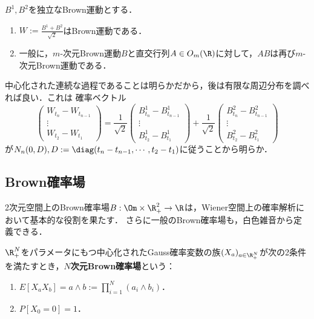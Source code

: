 \documentclass[uplatex,dvipdfmx]{jsreport}
\begin{document}
\begin{proposition}[Brown運動の回転不変性]\label{prop-sum-of-two-independent-Brownian-motion}
    $B^1,B^2$を独立なBrown運動とする．
    \begin{enumerate}
        \item $W:=\frac{B^1+B^2}{\sqrt{2}}$はBrown運動である．
        \item 一般に，$m$-次元Brown運動$B$と直交行列$A\in O_m(\R)$に対して，$AB$は再び$m$-次元Brown運動である．
    \end{enumerate}
\end{proposition}
\begin{Proof}
    中心化された連続な過程であることは明らかだから，後は有限な周辺分布を調べれば良い．これは
    確率ベクトル
    \[\begin{pmatrix}W_{t_n}-W_{t_{n-1}}\\\vdots\\W_{t_2}-W_{t_1}\end{pmatrix}=\frac{1}{\sqrt{2}}\begin{pmatrix}B^1_{t_n}-B^1_{t_{n-1}}\\\vdots\\B^1_{t_2}-B^1_{t_1}\end{pmatrix}+\frac{1}{\sqrt{2}}\begin{pmatrix}B^2_{t_n}-B^2_{t_{n-1}}\\\vdots\\B^2_{t_2}-B^2_{t_1}\end{pmatrix}\]
    が$N_n(0,D),D:=\diag(t_n-t_{n-1},\cdots,t_2-t_1)$に従うことから明らか．
\end{Proof}

\subsection{Brown確率場}

\begin{tcolorbox}[colframe=ForestGreen, colback=ForestGreen!10!white,breakable,colbacktitle=ForestGreen!40!white,coltitle=black,fonttitle=\bfseries\sffamily,
title=]
    2次元空間上のBrown確率場$B:\Om\times\R_+^2\to\R$は，Wiener空間上の確率解析において基本的な役割を果たす．
    さらに一般のBrown確率場も，白色雑音から定義できる．
\end{tcolorbox}

\begin{definition}
    $\R_+^N$をパラメータにもつ中心化されたGauss確率変数の族$(X_a)_{a\in\R_+^N}$が次の2条件を満たすとき，\textbf{$N$次元Brown確率場}という：
    \begin{enumerate}
        \item $E[X_aX_b]=a\land b:=\prod_{i=1}^N(a_i\land b_i)$．
        \item $P[X_0=0]=1$．
    \end{enumerate}
\end{definition}
\end{document}
